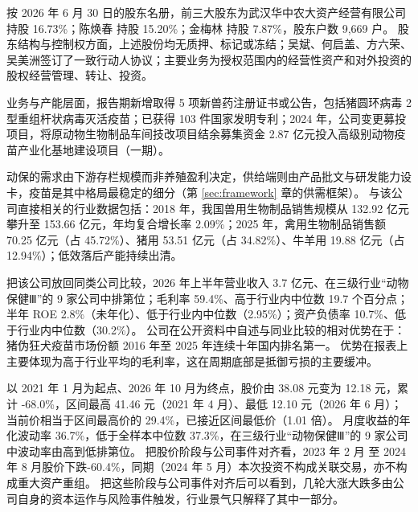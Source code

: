  按 2026 年 6 月 30 日的股东名册，前三大股东为武汉华中农大资产经营有限公司 持股 16.73\%；陈焕春 持股 15.20\%；金梅林 持股 7.87\%，股东户数 9,669 户。 股东结构与控制权方面，上述股份均无质押、标记或冻结；吴斌、何启盖、方六荣、吴美洲签订了一致行动人协议；主要业务为授权范围内的经营性资产和对外投资的股权经营管理、转让、投资。

 业务与产能层面，报告期新增取得 5 项新兽药注册证书或公告，包括猪圆环病毒 2 型重组杆状病毒灭活疫苗；已获得 103 件国家发明专利；2024 年，公司变更募投项目，将原动物生物制品车间技改项目结余募集资金 2.87 亿元投入高级别动物疫苗产业化基地建设项目（一期）。

 动保的需求由下游存栏规模而非养殖盈利决定，供给端则由产品批文与研发能力设卡，疫苗是其中格局最稳定的细分（第 \ref{sec:framework} 章的供需框架）。 与该公司直接相关的行业数据包括：2018 年，我国兽用生物制品销售规模从 132.92 亿元攀升至 153.66 亿元，年均复合增长率 2.09\%；2025 年，禽用生物制品销售额 70.25 亿元（占 45.72\%）、猪用 53.51 亿元（占 34.82\%）、牛羊用 19.88 亿元（占 12.94\%）；低效落后产能持续出清。

 把该公司放回同类公司比较，2026 年上半年营业收入 3.7 亿元、在三级行业“动物保健Ⅲ”的 9 家公司中排第位；毛利率 59.4\%、高于行业内中位数 19.7 个百分点；半年 ROE 2.8\%（未年化）、低于行业内中位数（2.95\%）；资产负债率 10.7\%、低于行业内中位数（30.2\%）。 公司在公开资料中自述与同业比较的相对优势在于：猪伪狂犬疫苗市场份额 2016 年至 2025 年连续十年国内排名第一。 优势在报表上主要体现为高于行业平均的毛利率，这在周期底部是抵御亏损的主要缓冲。

 以 2021 年 1 月为起点、2026 年 10 月为终点，股价由 38.08 元变为 12.18 元，累计 -68.0\%，区间最高 41.46 元（2021 年 4 月）、最低 12.10 元（2026 年 6 月）；当前价相当于区间最高价的 29.4\%，已接近区间最低价（1.01 倍）。 月度收益的年化波动率 36.7\%，低于全样本中位数 37.3\%，在三级行业“动物保健Ⅲ”的 9 家公司中波动率由高到低排第位。 把股价阶段与公司事件对齐看，2023 年 2 月 至 2024 年 8 月股价下跌-60.4\%，同期（2024 年 5 月）本次投资不构成关联交易，亦不构成重大资产重组。 把这些阶段与公司事件对齐后可以看到，几轮大涨大跌多由公司自身的资本运作与风险事件触发，行业景气只解释了其中一部分。

